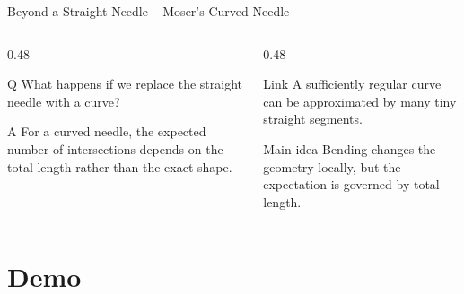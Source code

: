 \documentclass[aspectratio=169]{beamer}
\begin{document}
\begin{frame}{Beyond a Straight Needle -- Moser's Curved Needle}
  \begin{columns}[T]
    \begin{column}{0.48\textwidth}
      \begin{block}{Q}
        What happens if we replace the straight needle with a curve?
      \end{block}

      \begin{alertblock}{A}
        For a curved needle, the expected number of intersections depends on the total length rather than the exact shape.
      \end{alertblock}
    \end{column}
    \begin{column}{0.48\textwidth}
      \begin{exampleblock}{Link}
        A sufficiently regular curve can be approximated by many tiny straight segments.
      \end{exampleblock}

      \begin{block}{Main idea}
        Bending changes the geometry locally, but the expectation is governed by total length.
      \end{block}
    \end{column}
  \end{columns}
\end{frame}

\section{Demo}
\end{document}
